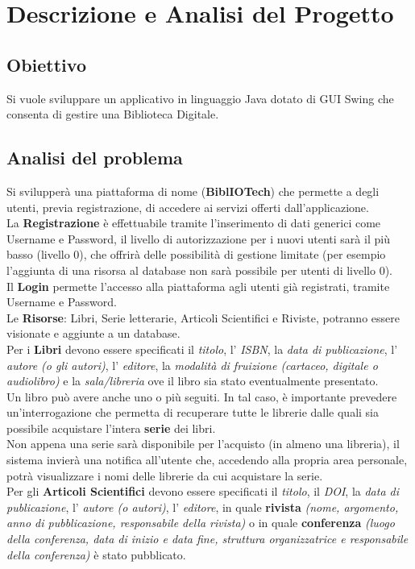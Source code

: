 \chapter{Descrizione e Analisi del Progetto}
\section{Obiettivo}
Si vuole sviluppare un applicativo in linguaggio Java dotato di GUI Swing che 
consenta di gestire una Biblioteca Digitale.
\section{Analisi del problema}
Si svilupper\`a una piattaforma di nome (\textbf{BiblIOTech}) che permette a degli utenti,
previa registrazione, di accedere ai servizi offerti dall'applicazione.
\\ \indent La \textbf{Registrazione} \`e effettuabile tramite l'inserimento di dati
generici come Username e Password, il livello di autorizzazione per i nuovi utenti sar\`a
il pi\`u basso (livello 0), che offrir\`a delle possibilit\`a di gestione limitate 
(per esempio l'aggiunta di una risorsa al database non sar\`a possibile per utenti di livello 0).
\\ \indent Il \textbf{Login} permette l'accesso alla piattaforma agli utenti gi\`a registrati,
 tramite Username e Password.
\\ \indent Le \textbf{Risorse}: Libri, Serie letterarie, Articoli Scientifici e Riviste, 
potranno essere visionate e aggiunte a un database.
\\ \indent Per i \textbf{Libri} devono essere specificati il \emph{titolo}, l' \emph{ISBN}, la
\emph{data di publicazione}, l' \emph{autore (o gli autori)}, l' \emph{editore}, la 
\emph{modalit\`a di fruizione (cartaceo, digitale o audiolibro)} e la \emph{sala/libreria} 
ove il libro sia stato eventualmente presentato.\\ 

Un libro pu\`o avere anche uno o pi\`u seguiti. In tal caso, \`e 
importante prevedere un'interrogazione che permetta di recuperare tutte le librerie dalle quali
sia possibile acquistare l'intera \textbf{serie} dei libri.
\\
Non appena una serie sar\`a disponibile per l'acquisto (in almeno una libreria), il sistema 
invier\`a una notifica all'utente che, accedendo alla propria area personale, potr\`a visualizzare
i nomi delle librerie da cui acquistare la serie.
\\ \indent Per gli \textbf{Articoli Scientifici} devono essere specificati il \emph{titolo}, 
il \emph{DOI}, la \emph{data di publicazione}, l' \emph{autore (o autori)}, l' \emph{editore}, 
in quale \textbf{rivista} \emph{(nome, argomento, anno di pubblicazione, responsabile della 
rivista)} o in quale \textbf{conferenza} \emph{(luogo della conferenza, data di inizio e data 
fine, struttura organizzatrice e responsabile della conferenza)} \`e stato pubblicato.
